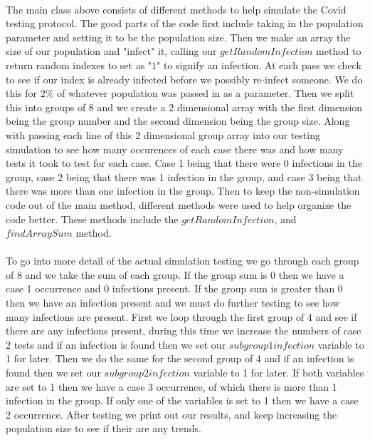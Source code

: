 \documentclass[letterpaper, 10pt,DIV=13]{scrartcl}
\numberwithin{equation}{section} %
\numberwithin{figure}{section} %
\numberwithin{table}{section} %
\begin{document}
\paragraph{} The main class above consists of different methods to help simulate the Covid testing protocol. The good parts of the code first include taking in the population parameter and setting it to be the population size. Then we make an array the size of our population and "infect" it, calling our $getRandomInfection$ method to return random indexes to set as "$1$" to signify an infection. At each pass we check to see if our index is already infected before we possibly re-infect someone. We do this for $2\%$ of whatever population was passed in as a parameter. Then we split this into groups of 8 and we create a 2 dimensional array with the first dimension being the group number and the second dimension being the group size.  Along with passing each line of this 2 dimensional group array into our testing simulation to see how many occurences of each case there was and how many tests it took to test for each case. Case 1 being that there were 0 infections in the group, case 2 being that there was 1 infection in the group, and case 3 being that there was more than one infection in the group. Then to keep the non-simulation code out of the main method, different methods were used to help organize the code better. These methods include the $getRandomInfection$, and $findArraySum$ method.

\paragraph{} To go into more detail of the actual simulation testing we go through each group of 8 and we take the sum of each group. If the group sum is 0 then we have a case 1 occurrence and 0 infections present. If the group sum is greater than 0 then we have an infection present and we must do further testing to see how many infections are present. First we loop through the first group of 4 and see if there are any infections present, during this time we increase the numbers of case 2 tests and if an infection is found then we set our $subgroup1infection$ variable to 1 for later. Then we do the same for the second group of 4 and if an infection is found then we set our $subgroup2infection$ variable to 1 for later. If both variables are set to 1 then we have a case 3 occurrence, of which there is more than 1 infection in the group. If only one of the variables is set to 1 then we have a case 2 occurrence. After testing we print out our results, and keep increasing the population size to see if their are any trends. 
\end{document}
